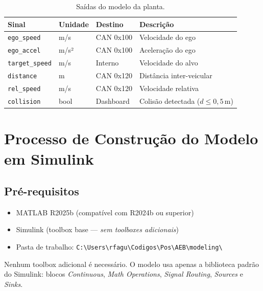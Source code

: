 \documentclass[12pt,a4paper]{article}
\newcommand{\param}[1]{\texttt{\color{laranjacode}#1}}
\begin{document}
\begin{table}[H]
  \centering
  \caption{Saídas do modelo da planta.}
  \begin{tabularx}{\linewidth}{lllX}
    \toprule
    \rowcolor{azulescuro!90}
    \color{white}\textbf{Sinal} &
    \color{white}\textbf{Unidade} &
    \color{white}\textbf{Destino} &
    \color{white}\textbf{Descrição} \\
    \midrule
    \param{ego\_speed}    & m/s   & CAN 0x100 & Velocidade do ego \\
    \rowcolor{azulclaro!50}
    \param{ego\_accel}    & m/s²  & CAN 0x100 & Aceleração do ego \\
    \param{target\_speed} & m/s   & Interno   & Velocidade do alvo \\
    \rowcolor{azulclaro!50}
    \param{distance}      & m     & CAN 0x120 & Distância inter-veicular \\
    \param{rel\_speed}    & m/s   & CAN 0x120 & Velocidade relativa \\
    \rowcolor{azulclaro!50}
    \param{collision}     & bool  & Dashboard & Colisão detectada ($d \leq 0{,}5$\,m) \\
    \bottomrule
  \end{tabularx}
\end{table}

\section{Processo de Construção do Modelo em Simulink}
\label{sec:processo}

\subsection{Pré-requisitos}

\begin{itemize}
  \item MATLAB R2025b (compatível com R2024b ou superior)
  \item Simulink (toolbox base --- \emph{sem toolboxes adicionais})
  \item Pasta de trabalho: \texttt{C:\textbackslash Users\textbackslash rfagu\textbackslash Codigos\textbackslash Pos\textbackslash AEB\textbackslash modeling\textbackslash}
\end{itemize}

\begin{notabox}
Nenhum toolbox adicional é necessário. O modelo usa apenas a biblioteca padrão
do Simulink: blocos \emph{Continuous}, \emph{Math Operations},
\emph{Signal Routing}, \emph{Sources} e \emph{Sinks}.
\end{notabox}
\end{document}
